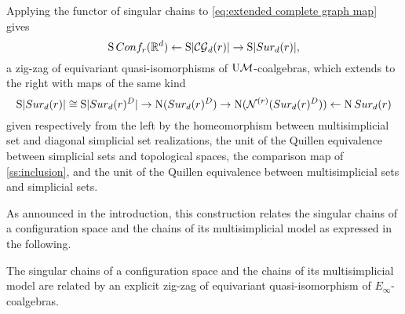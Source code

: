 Applying the functor of singular chains to \cref{eq:extended complete graph map} gives
\[
\operatorname{S}Conf_{r}(\mathbb{R}^{d}) \leftarrow
\operatorname{S}\lvert\mathcal{CG}_{d}(r)\rvert \to
\operatorname{S}\lvert Sur_{d}(r)\rvert,
\]
a zig-zag of equivariant quasi-isomorphisms of $\mathrm{U}\mathcal{M}$-coalgebras, which extends to the right with maps of the same kind
\[
\operatorname{S}\lvert Sur_{d}(r)\rvert \cong
\operatorname{S} \lvert Sur_{d}(r)^{D}\rvert \to
\operatorname{N}(Sur_{d}(r)^D) \to
\operatorname{N}(\mathcal{N}^{(r)}(Sur_{d}(r)^D)) \leftarrow
\operatorname{N}Sur_{d}(r)
\]
given respectively from the left by the homeomorphism between multisimplicial set and diagonal simplicial set realizations, the unit of the Quillen equivalence between simplicial sets and topological spaces, the comparison map of \cref{ss:inclusion}, and the unit of the Quillen equivalence between multisimplicial sets and simplicial sets.

As announced in the introduction, this construction relates the singular chains of a configuration space and the chains of its multisimplicial model as expressed in the following.
\begin{theorem}
	The singular chains of a configuration space and the chains of its multisimplicial model are related by an explicit zig-zag of equivariant quasi-isomorphism of $E_\infty$-coalgebras.
\end{theorem}
